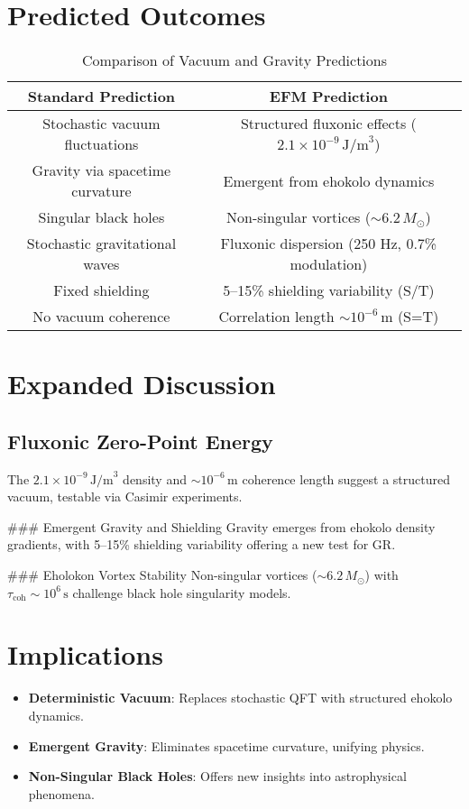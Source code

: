 \documentclass[11pt]{article}
\begin{document}
\section{Predicted Outcomes}
\begin{table}[htbp]
    \centering
    \begin{tabular}{|c|c|}
        \hline
        \textbf{Standard Prediction} & \textbf{EFM Prediction} \\
        \hline
        Stochastic vacuum fluctuations & Structured fluxonic effects (\(2.1 \times 10^{-9} \, \text{J/m}^3\)) \\
        Gravity via spacetime curvature & Emergent from ehokolo dynamics \\
        Singular black holes & Non-singular vortices (\(\sim 6.2 \, M_\odot\)) \\
        Stochastic gravitational waves & Fluxonic dispersion (250 Hz, 0.7\% modulation) \\
        Fixed shielding & 5–15\% shielding variability (S/T) \\
        No vacuum coherence & Correlation length \(\sim 10^{-6} \, \text{m}\) (S=T) \\
        \hline
    \end{tabular}
    \caption{Comparison of Vacuum and Gravity Predictions}
    \label{tab:predictions}
\end{table}

\section{Expanded Discussion}
\subsection{Fluxonic Zero-Point Energy}
The \(2.1 \times 10^{-9} \, \text{J/m}^3\) density and \(\sim 10^{-6} \, \text{m}\) coherence length suggest a structured vacuum, testable via Casimir experiments.

### Emergent Gravity and Shielding
Gravity emerges from ehokolo density gradients, with 5–15\% shielding variability offering a new test for GR.

### Eholokon Vortex Stability
Non-singular vortices (\(\sim 6.2 \, M_\odot\)) with \(\tau_{\text{coh}} \sim 10^6 \, \text{s}\) challenge black hole singularity models.

\section{Implications}
\begin{itemize}
    \item \textbf{Deterministic Vacuum}: Replaces stochastic QFT with structured ehokolo dynamics.
    \item \textbf{Emergent Gravity}: Eliminates spacetime curvature, unifying physics.
    \item \textbf{Non-Singular Black Holes}: Offers new insights into astrophysical phenomena.
\end{itemize}
\end{document}
